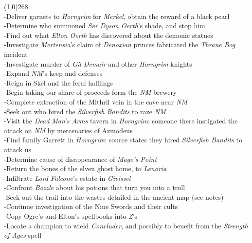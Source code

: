 \documentclass[letterpaper]{article}
\newcommand{\colline}{\noindent\line(1,0){268} \\}
\newcommand{\e}[1]{\emph{#1}}
\newcommand{\B}[1]{\textbf{#1}}
\newenvironment{notesection}[1]
{\noindent {\huge \B{#1}} \par
\vspace{-0.75em}
\colline
\begingroup\fontsize{9pt}{12pt}\selectfont}
{\endgroup}
\begin{document}
\begin{notesection}{Quests}
-Deliver garnets to \e{Horngrim} for \e{Merkel}, obtain the reward of a black pearl\\
-Determine who summoned \e{Ser Dyson Oerth}'s shade, and stop him\\
-Find out what \e{Elton Oerth} has discovered about the demonic statues\\
-Investigate \e{Mertensia}'s claim of \e{Denoxian} princes fabricated the \e{Thrane Bog} incident\\
-Investigate murder of \e{Gil Demair} and other \e{Horngrim} knights\\

\noindent-Expand \e{NM}'s keep and defenses\\
-Reign in Skel and the feral halflings\\
-Begin taking our share of proceeds form the \e{NM} brewery\\
-Complete extraction of the Mithril vein in the cave near \e{NM}\\
-Seek out who hired the \e{Silverfish Bandits} to raze \e{NM}\\
-Visit the \e{Dead Man's Arms} tavern in \e{Horngrim}: someone there instigated the attack on \e{NM} by mercenaries of Azmodeus\\
-Find family Garrett in \e{Horngrim}: source states they hired \e{Silverfish Bandits} to attack us\\

\noindent-Determine cause of disappearance of \e{Mage's Point}\\
-Return the bones of the elven ghost home, to \e{Lenoria}\\
-Infiltrate \e{Lord Falcone}'s estate in \e{Givissel}\\

\noindent-Confront \e{Bozzle} about his potions that turn you into a troll\\
-Seek out the trail into the wastes detailed in the ancient map (see notes)\\
-Continue investigation of the Nine Swords and their cults\\

\noindent-Copy Ogre's and Elton's spellbooks into \e{Z}'s\\
-Locate a champion to wield \e{Concluder}, and possibly to benefit from the \e{Strength of Ages} spell\\
\end{notesection}
\end{document}
